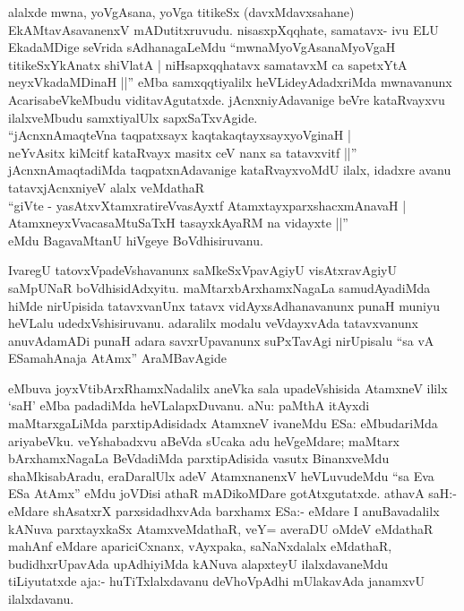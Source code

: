 \begin{artha}
alalxde mwna, yoVgAsana, yoVga titikeSx (davxMdavxsahane) EkAMtavAsavanenxV mADutitxruvudu. nisasxpXqqhate, samatavx- ivu ELU EkadaMDige seVrida sAdhanagaLeMdu ``mwnaMyoVgAsanaMyoVgaH titikeSxYkAnatx shiVlatA | niHsapxqqhatavx samatavxM ca sapetxYtA neyxVkadaMDinaH ||'' eMba samxqqtiyalilx heVLideyAdadxriMda mwnavanunx AcarisabeVkeMbudu viditavAgutatxde. jAcnxniyAdavanige beVre kataRvayxvu ilalxveMbudu samxtiyalUlx sapxSaTxvAgide. \\``jAcnxnAmaqteVna taqpatxsayx kaqtakaqtayxsayxyoVginaH |\\
neYvAsitx kiMcitf kataRvayx masitx ceV nanx sa tatavxvitf ||''\\ jAcnxnAmaqtadiMda taqpatxnAdavanige kataRvayxvoMdU ilalx, idadxre avanu tatavxjAcnxniyeV alalx veMdathaR \\``giVte - yasAtxvXtamxratireVvasAyxtf AtamxtayxparxshacxmAnavaH |\\
AtamxneyxVvacasaMtuSaTxH tasayxkAyaRM na vidayxte ||''\\ eMdu BagavaMtanU hiVgeye BoVdhisiruvanu.
\end{artha}

\begin{artha}
IvaregU tatovxVpadeVshavanunx saMkeSxVpavAgiyU visAtxravAgiyU saMpUNaR boVdhisidAdxyitu. maMtarxbArxhamxNagaLa samudAyadiMda hiMde nirUpisida tatavxvanUnx tatavx vidAyxsAdhanavanunx punaH muniyu heVLalu udedxVshisiruvanu. adaralilx modalu veVdayxvAda tatavxvanunx anuvAdamADi punaH adara savxrUpavanunx suPxTavAgi nirUpisalu ``sa vA ESamahAnaja AtAmx'' AraMBavAgide
\end{artha}


\begin{artha}
eMbuva joyxVtibArxRhamxNadalilx aneVka sala upadeVshisida AtamxneV ililx `saH' eMba padadiMda heVLalapxDuvanu. aNu: paMthA itAyxdi maMtarxgaLiMda parxtipAdisidadx AtamxneV ivaneMdu ESa: eMbudariMda ariyabeVku. veYshabadxvu aBeVda sUcaka adu heVgeMdare; maMtarx bArxhamxNagaLa BeVdadiMda parxtipAdisida vasutx BinanxveMdu shaMkisabAradu, eraDaralUlx adeV AtamxnanenxV heVLuvudeMdu ``sa Eva ESa AtAmx'' eMdu joVDisi athaR mADikoMDare gotAtxgutatxde. athavA saH:- eMdare shAsatxrX parxsidadhxvAda barxhamx ESa:- eMdare I anuBavadalilx kANuva parxtayxkaSx AtamxveMdathaR, veY= averaDU oMdeV eMdathaR mahAnf eMdare apariciCxnanx, vAyxpaka, saNaNxdalalx eMdathaR, budidhxrUpavAda upAdhiyiMda kANuva alapxteyU ilalxdavaneMdu tiLiyutatxde aja:- huTiTxlalxdavanu deVhoVpAdhi mUlakavAda janamxvU ilalxdavanu.
\end{artha}

